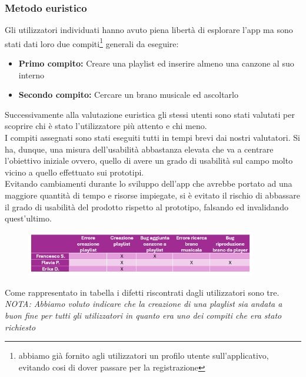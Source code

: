 \documentclass{article}
\begin{document}
		\subsubsection{Metodo euristico}
		Gli utilizzatori individuati hanno avuto piena libertà di esplorare l'app ma sono stati dati loro due compiti\footnote{abbiamo già fornito agli utilizzatori un profilo utente sull'applicativo, evitando cosi di dover passare per la registrazione} generali da eseguire:
		\begin{itemize}
			\item \textbf{Primo compito:} Creare una playlist ed inserire almeno una canzone al suo interno
			\item \textbf{Secondo compito:} Cercare un brano musicale ed ascoltarlo
		\end{itemize}
		Successivamente alla valutazione euristica gli stessi utenti sono stati valutati per scoprire chi è stato l’utilizzatore più attento e chi meno.\\
		I compiti assegnati sono stati eseguiti tutti in tempi brevi dai nostri valutatori. Si ha, dunque, una misura dell'usabilità abbastanza elevata che va a centrare l'obiettivo iniziale ovvero, quello di avere un grado di usabilità sul campo molto vicino a quello effettuato sui prototipi.\\
		Evitando cambiamenti durante lo sviluppo dell'app che avrebbe portato ad una maggiore quantità di tempo e risorse impiegate, si è evitato il rischio di abbassare il grado di usabilità del prodotto rispetto al prototipo, falsando ed invalidando quest'ultimo.
		\begin{figure}[H]
			\centering
			\includegraphics[width=0.9\textwidth]{Immagini/tabella}
		\end{figure}
		Come rappresentato in tabella i difetti riscontrati dagli utilizzatori sono tre.\\
		\textit{NOTA: Abbiamo voluto indicare che la creazione di una playlist sia andata a buon fine per tutti gli utilizzatori in quanto era uno dei compiti che era stato richiesto}
		
\end{document}
